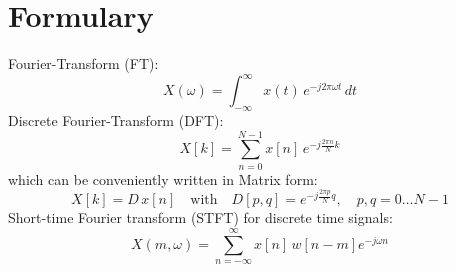 \chapter{Formulary}

Fourier-Transform (FT):
\begin{equation}
    X(\omega) = \int_{-\infty}^\infty x(t) \, e^{-j 2 \pi \omega t} \,dt
\end{equation}
\noindent
Discrete Fourier-Transform (DFT):
\begin{equation}
    X[k] = \sum_{n=0}^{N-1} x[n] \, e^{-j\frac{2 \pi n}{N}k}
\end{equation}
which can be conveniently written in Matrix form:
\begin{equation}
    X[k] = D\, x[n] \quad \mathrm{with} 
    \quad D[p, q] = e^{-j\frac{2 \pi p}{N} q},
    \quad p, q = 0 \dots N-1
\end{equation}
Short-time Fourier transform (STFT) for discrete time signals:
\begin{equation}
    X(m, \omega) = \sum_{n=-\infty}^{\infty} x[n] \, w[n-m] e^{-j\omega n}
\end{equation}